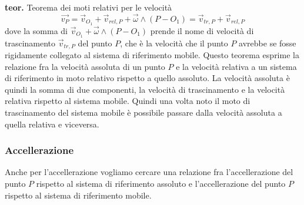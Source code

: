 \textbf{teor.} Teorema dei moti relativi per le velocità
\[
    \vec{v_P} = 
        \vec{v}_{O_1} + \vec{v}_{rel, P} + \vec{\omega} \land (P-O_1) = 
        \vec{v}_{tr,P} + \vec{v}_{rel, P}
\]
dove la somma di $\vec{v}_{O_1} + \vec{\omega} \land (P-O_1)$ prende il nome di velocità di trascinamento $\vec{v}_{tr,P}$ del punto $P$, che è la velocità che il punto $P$ avrebbe se fosse rigidamente collegato al sistema di riferimento mobile.\newline
Questo teorema esprime la relazione fra la velocità assoluta di un punto $P$ e la velocità relativa a un sistema di riferimento in moto relativo rispetto a quello assoluto. La velocità assoluta è quindi la somma di due componenti, la velocità di trascinamento e la velocità relativa rispetto al sistema mobile.\newline
Quindi una volta noto il moto di trascinamento del sistema mobile è possibile passare dalla velocità assoluta a quella relativa e viceversa.
\subsubsection{Accellerazione}
Anche per l'accellerazione vogliamo cercare una relazione fra l'accellerazione del punto $P$ rispetto al sistema di riferimento assoluto e l'accellerazione del punto $P$ rispetto al sistema di riferimento mobile.\newline
